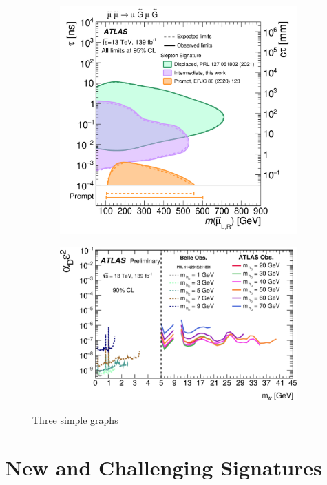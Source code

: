 \documentclass{moriond}
\begin{document}
\begin{figure}[htp]
\begin{subfigure}[b]{0.32\textwidth}
         \includegraphics[width=\textwidth]{micro}
         \caption{}
         \label{fig:micro}
     \end{subfigure}
     \begin{subfigure}[b]{0.32\textwidth}
         \centering
         \includegraphics[width=\textwidth]{dark}
         \caption{}
         \label{fig:micro}
     \end{subfigure}
        \caption{Three simple graphs}
        \label{fig:limits2}
\end{figure}

\section{New and Challenging Signatures}
\end{document}
